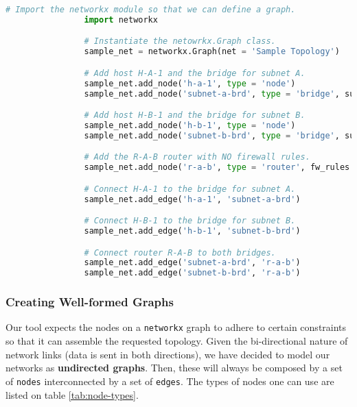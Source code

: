             \begin{lstlisting}[language = python, caption = Defining the Sample Topology as a \texttt{networkx} graph., label = lst:sample-topology-graph]
                # Import the networkx module so that we can define a graph.
                import networkx

                # Instantiate the netowrkx.Graph class.
                sample_net = networkx.Graph(net = 'Sample Topology')

                # Add host H-A-1 and the bridge for subnet A.
                sample_net.add_node('h-a-1', type = 'node')
                sample_net.add_node('subnet-a-brd', type = 'bridge', subnet = '10.0.0.0/24')

                # Add host H-B-1 and the bridge for subnet B.
                sample_net.add_node('h-b-1', type = 'node')
                sample_net.add_node('subnet-b-brd', type = 'bridge', subnet = '10.0.1.0/24')

                # Add the R-A-B router with NO firewall rules.
                sample_net.add_node('r-a-b', type = 'router', fw_rules = {})

                # Connect H-A-1 to the bridge for subnet A.
                sample_net.add_edge('h-a-1', 'subnet-a-brd')

                # Connect H-B-1 to the bridge for subnet B.
                sample_net.add_edge('h-b-1', 'subnet-b-brd')

                # Connect router R-A-B to both bridges.
                sample_net.add_edge('subnet-a-brd', 'r-a-b')
                sample_net.add_edge('subnet-b-brd', 'r-a-b')
            \end{lstlisting}

            \subsubsection{Creating Well-formed Graphs}
                Our tool expects the nodes on a \texttt{networkx} graph to adhere to certain constraints so that it can assemble the requested topology. Given the bi-directional nature of network links (data is sent in both directions), we have decided to model our networks as \textbf{undirected graphs}. Then, these will always be composed by a set of \texttt{nodes} interconnected by a set of \texttt{edges}. The types of nodes one can use are listed on table \ref{tab:node-types}.\\


